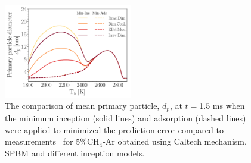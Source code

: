 
\begin{figure}[H]
	\centering
	\includegraphics[width=0.5\textwidth]{Figures/Results/Shocktube/Agafonov2016_cpr/d_p_maxincads_combined.pdf}
	\caption{The comparison of mean primary particle, $d_p$, at $t=$1.5 ms when the minimum inception (solid lines) and adsorption (dashed lines) were applied to minimized the prediction error compared to measurements~\citep{agafonov2016unified} for 5\%$\mathrm{CH_4}$-Ar obtained using Caltech mechanism, SPBM and different inception models.}
	\label{fig:shockagof_dp_maxincads_cpr} 
\end{figure}


